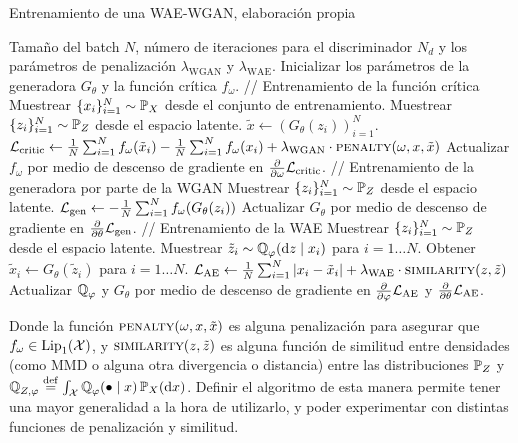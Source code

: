 \begin{algorithm}[H]
    \caption{Entrenamiento de una WAE-WGAN, elaboración propia}\label{alg:WAE-WGAN}
    \begin{algorithmic}[1]
        \Require Tamaño del batch $N$, número de iteraciones para el discriminador $N_d$ y los parámetros de penalización $\lambda_{\mathrm{WGAN}}$ y $\lambda_{\mathrm{WAE}}$.
        \State Inicializar los parámetros de la generadora $G_\theta$ y la función crítica $f_\omega$.
        \State // {Entrenamiento de la función crítica}
        \State Muestrear $\{x_i\}_{i=1}^{N} \sim \Prob_X$ desde el conjunto de entrenamiento.
        \State Muestrear $\{z_i\}_{i=1}^{N} \sim \Prob_Z$ desde el espacio latente.
        \State $\tilde x \gets (G_\theta(z_i))_{i=1}^{N}$.
        \State $\cL_{\mathrm{critic}} \gets
            \frac{1}{N} \sum_{i=1}^{N} f_{\omega}(\tilde x_i) - \frac{1}{N} \sum_{i=1}^{N} f_{\omega}(x_i) + \lambda_{\mathrm{WGAN}} \cdot \Call{penalty}{\omega, x, \tilde x}$
        \State Actualizar $f_{\omega}$ por medio de descenso de gradiente en $\pdv{\omega} \mathcal{L}_{\mathrm{critic}}$.
        \EndFor
        \State // {Entrenamiento de la generadora por parte de la WGAN}
        \State Muestrear $\{z_i\}_{i=1}^{N} \sim \Prob_Z$ desde el espacio latente.
        \State $\mathcal{L}_{\mathrm{gen}} \gets - \frac{1}{N}\sum_{i=1}^{N} f_\omega(G_\theta(z_i))$
        \State Actualizar $G_\theta$ por medio de descenso de gradiente en $\pdv{\theta} \mathcal{L}_{\mathrm{gen}}$.
        \State // {Entrenamiento de la WAE}
        \State Muestrear $\{z_i\}_{i=1}^{N} \sim \Prob_Z$ desde el espacio latente.
        \State Muestrear $\tilde z_i \sim \ProbQ_\varphi(\dd z \mid x_i)$ para $i=1\dots N$.
        \State Obtener $\tilde x_i \gets G_\theta(\tilde z_i)$ para $i=1\dots N$.
        \State $\cL_{\mathrm{AE}} \gets \frac{1}{N}\sum_{i=1}^{N} |x_i - \tilde x_i| + \lambda_{\mathrm{WAE}} \cdot \Call{similarity}{z, \tilde z}$
        \State Actualizar $\ProbQ_\varphi$ y $G_\theta$ por medio de descenso de gradiente en $\pdv{\varphi} \cL_{\mathrm{AE}}$ y $\pdv{\theta} \mathcal{L}_{\mathrm{AE}}$.
        \EndWhile
    \end{algorithmic}
\end{algorithm}

Donde la función $\Call{penalty}{\omega, x, \tilde x}$ es alguna penalización para asegurar que $f_\omega\in \Lip_1(\cX)$, y $\Call{similarity}{z, \tilde z}$ es alguna función de similitud entre densidades (como MMD o alguna otra divergencia o distancia) entre las distribuciones $\Prob_Z$ y $\ProbQ_{Z, \varphi} \eqdef \int_{\cX} \ProbQ_\varphi(\bullet \mid x) \Prob_X(\dx)$. Definir el algoritmo de esta manera permite tener una mayor generalidad a la hora de utilizarlo, y poder experimentar con distintas funciones de penalización y similitud.

